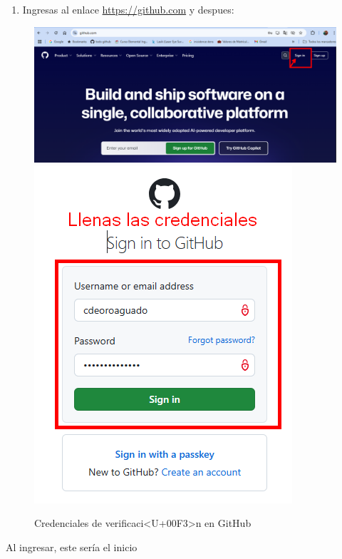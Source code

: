 \documentclass[
]{book}
\providecommand{\tightlist}{%
  \setlength{\itemsep}{0pt}\setlength{\parskip}{0pt}}
\begin{document}
\begin{enumerate}
\def\labelenumi{\arabic{enumi}.}
\setcounter{enumi}{2}
\tightlist
\item
  Ingresas al enlace \url{https://github.com} y despues:
\end{enumerate}

\begin{figure}

{\centering \includegraphics[width=0.7\linewidth]{images/gh3} \includegraphics[width=0.7\linewidth]{images/gh4} 

}

\caption{Credenciales de verificaci<U+00F3>n en GitHub}\label{fig:github-c-fig}
\end{figure}

Al ingresar, este sería el inicio
\end{document}
